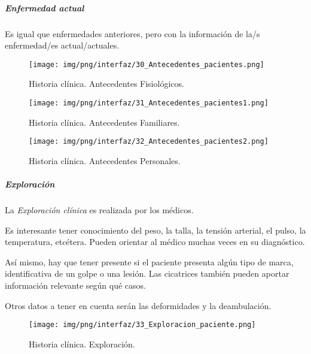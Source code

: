 \documentclass[a4paper,oneside,11pt]{book}
\begin{document}
			\subparagraph{Enfermedad actual} %
			\label{par:enfermedad_actual}
				Es igual que enfermedades anteriores, pero con la información de la/s enfermedad/es actual/actuales.
			
			\begin{figure}[H]
			  \centering
			    \texttt{[image: img/png/interfaz/30\_Antecedentes\_pacientes.png]}
			  \caption{Historia clínica. Antecedentes Fisiológicos.}
			  \label{fig:iu_antecedentes_fisiologicos}
			\end{figure}
			
			\begin{figure}[H]
			  \centering
			    \texttt{[image: img/png/interfaz/31\_Antecedentes\_pacientes1.png]}
			  \caption{Historia clínica. Antecedentes Familiares.}
			  \label{fig:iu_antecedentes_familiares}
			\end{figure}
			
			\begin{figure}[H]
			  \centering
			    \texttt{[image: img/png/interfaz/32\_Antecedentes\_pacientes2.png]}
			  \caption{Historia clínica. Antecedentes Personales.}
			  \label{fig:iu_antecedentes_personales}
			\end{figure}
			
		
		\subparagraph{Exploración} %
		\label{par:exploracion}
		
			La \textit{Exploración clínica} es realizada por los médicos. 
			
			Es interesante tener conocimiento del peso, la talla, la tensión arterial, el pulso, la temperatura, etcétera. Pueden orientar al médico muchas veces en su diagnóstico.
			
			Así mismo, hay que tener presente si el paciente presenta algún tipo de marca, identificativa de un golpe o una lesión. Las cicatrices también pueden aportar información relevante según qué casos.
			
			Otros datos a tener en cuenta serán las deformidades y la deambulación.
			
						
			\begin{figure}[H]
			  \centering
			    \texttt{[image: img/png/interfaz/33\_Exploracion\_paciente.png]}
			  \caption{Historia clínica. Exploración.}
			  \label{fig:iu_exploracion}
			\end{figure}
			
\end{document}
